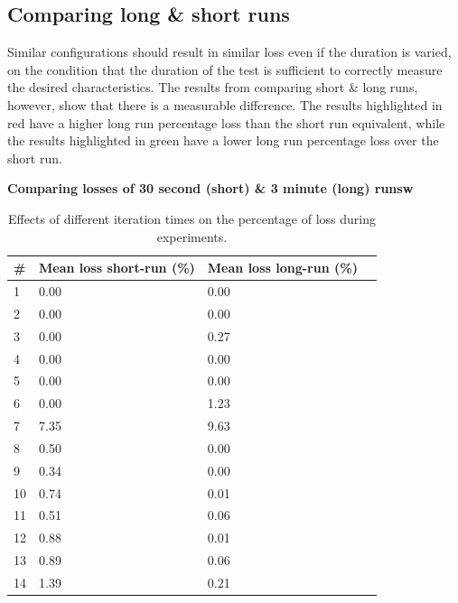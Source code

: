 \documentclass[]{article}
\begin{document}
\subsection{Comparing long \& short runs}
Similar configurations should result in similar loss even if the duration is varied, on the condition that the duration of the test is sufficient to correctly measure the desired characteristics. The results from comparing short \& long runs, however, show that there is a measurable difference. The results highlighted in red have a higher long run percentage loss than the short run equivalent, while the results highlighted in green have a lower long run percentage loss over the short run.

\begin{table}[H]
	\textbf{Comparing losses of 30 second (short) \& 3 minute (long) runsw}	
	\begin{center}
		\begin{tabular}{ | l | l | l | l | }
			\hline
			\textbf{\#} & \textbf{Mean loss short-run (\%)} & \textbf{Mean loss long-run (\%)} \\ \hline
			
			1 & 0.00 & 0.00 \\ \hline
			2 & 0.00 & 0.00 \\ \hline
			\rowcolor{red}
			3 & 0.00 & 0.27 \\ \hline
			4 & 0.00 & 0.00 \\ \hline
			5 & 0.00 & 0.00 \\ \hline
			\rowcolor{red}
			6 & 0.00 & 1.23 \\ \hline
			\rowcolor{red}
			7 & 7.35 & 9.63 \\ \hline
			\rowcolor{green}
			8 & 0.50 & 0.00 \\ \hline
			\rowcolor{green}
			9 & 0.34 & 0.00 \\ \hline
			\rowcolor{green}
			10 & 0.74 & 0.01 \\ \hline
			\rowcolor{green}
			11 & 0.51 & 0.06 \\ \hline
			\rowcolor{green}
			12 & 0.88 & 0.01 \\ \hline
			\rowcolor{green}
			13 & 0.89 & 0.06 \\ \hline
			\rowcolor{green}
			14 & 1.39 & 0.21 \\ \hline
		\end{tabular}
		\caption{Effects of different iteration times on the percentage of loss during experiments.}
		\label{tab:resultsroundabsolute}
	\end{center}
\end{table}
\end{document}
